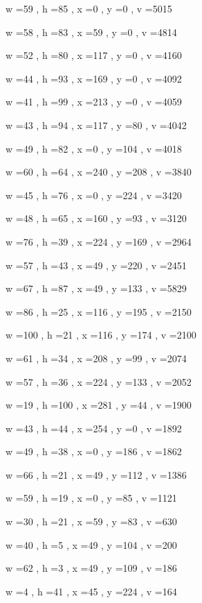 \documentclass[11pt]{article}
\begin{document}
w =59 , h =85 , x =0 , y =0 , v =5015
\par
w =58 , h =83 , x =59 , y =0 , v =4814
\par
w =52 , h =80 , x =117 , y =0 , v =4160
\par
w =44 , h =93 , x =169 , y =0 , v =4092
\par
w =41 , h =99 , x =213 , y =0 , v =4059
\par
w =43 , h =94 , x =117 , y =80 , v =4042
\par
w =49 , h =82 , x =0 , y =104 , v =4018
\par
w =60 , h =64 , x =240 , y =208 , v =3840
\par
w =45 , h =76 , x =0 , y =224 , v =3420
\par
w =48 , h =65 , x =160 , y =93 , v =3120
\par
w =76 , h =39 , x =224 , y =169 , v =2964
\par
w =57 , h =43 , x =49 , y =220 , v =2451
\par
w =67 , h =87 , x =49 , y =133 , v =5829
\par
w =86 , h =25 , x =116 , y =195 , v =2150
\par
w =100 , h =21 , x =116 , y =174 , v =2100
\par
w =61 , h =34 , x =208 , y =99 , v =2074
\par
w =57 , h =36 , x =224 , y =133 , v =2052
\par
w =19 , h =100 , x =281 , y =44 , v =1900
\par
w =43 , h =44 , x =254 , y =0 , v =1892
\par
w =49 , h =38 , x =0 , y =186 , v =1862
\par
w =66 , h =21 , x =49 , y =112 , v =1386
\par
w =59 , h =19 , x =0 , y =85 , v =1121
\par
w =30 , h =21 , x =59 , y =83 , v =630
\par
w =40 , h =5 , x =49 , y =104 , v =200
\par
w =62 , h =3 , x =49 , y =109 , v =186
\par
w =4 , h =41 , x =45 , y =224 , v =164
\par
\newpage
\end{document}
